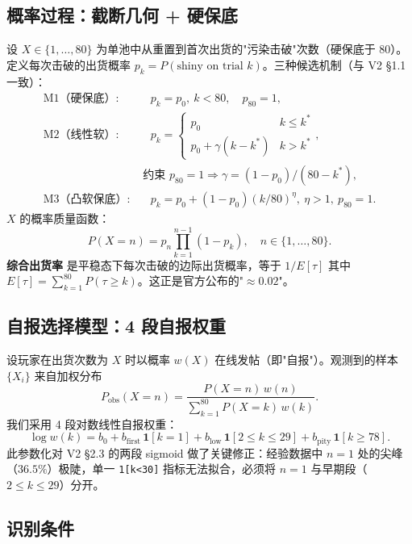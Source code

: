 \documentclass[journal]{IEEEtran}
\begin{document}
\subsection{概率过程：截断几何 + 硬保底}

设 $X \in \{1, \dots, 80\}$ 为单池中从重置到首次出货的"污染击破"次数（硬保底于 80）。定义每次击破的出货概率 $p_k = P(\text{shiny on trial } k)$。三种候选机制（与 V2 §1.1 一致）：
\begin{align}
\text{M1（硬保底）:} &\quad p_k = p_0,\ k<80,\quad p_{80}=1, \\
\text{M2（线性软）:} &\quad p_k = \begin{cases} p_0 & k\le k^* \\ p_0 + \gamma(k-k^*) & k>k^* \end{cases}, \\
& \text{ 约束 } p_{80}=1 \Rightarrow \gamma = (1-p_0)/(80-k^*), \nonumber \\
\text{M3（凸软保底）:} &\quad p_k = p_0 + (1-p_0)(k/80)^\eta,\ \eta>1,\ p_{80}{=}1.
\end{align}
$X$ 的概率质量函数：
\begin{equation}
P(X = n) = p_n \prod_{k=1}^{n-1}(1-p_k), \quad n \in \{1, \dots, 80\}.
\label{eq:pmf}
\end{equation}
\textbf{综合出货率} 是平稳态下每次击破的边际出货概率，等于 $1/E[\tau]$ 其中 $E[\tau] = \sum_{k=1}^{80}P(\tau \ge k)$。这正是官方公布的"$\approx 0.02$"。

\subsection{自报选择模型：4 段自报权重}

设玩家在出货次数为 $X$ 时以概率 $w(X)$ 在线发帖（即"自报"）。观测到的样本 $\{X_i\}$ 来自加权分布
\begin{equation}
P_{\text{obs}}(X = n) = \frac{P(X = n)\,w(n)}{\sum_{k=1}^{80}P(X = k)\,w(k)}.
\label{eq:obs}
\end{equation}
我们采用 4 段对数线性自报权重：
\begin{equation}
\log w(k) = b_0 + b_{\text{first}}\,\mathbf{1}[k{=}1] + b_{\text{low}}\,\mathbf{1}[2{\le}k{\le}29] + b_{\text{pity}}\,\mathbf{1}[k{\ge}78].
\label{eq:wk}
\end{equation}
此参数化对 V2 §2.3 的两段 sigmoid 做了关键修正：经验数据中 $n=1$ 处的尖峰（$36.5\%$）极陡，单一 \texttt{1[k<30]} 指标无法拟合，必须将 $n=1$ 与早期段（$2\le k \le 29$）分开。

\subsection{识别条件}
\end{document}
